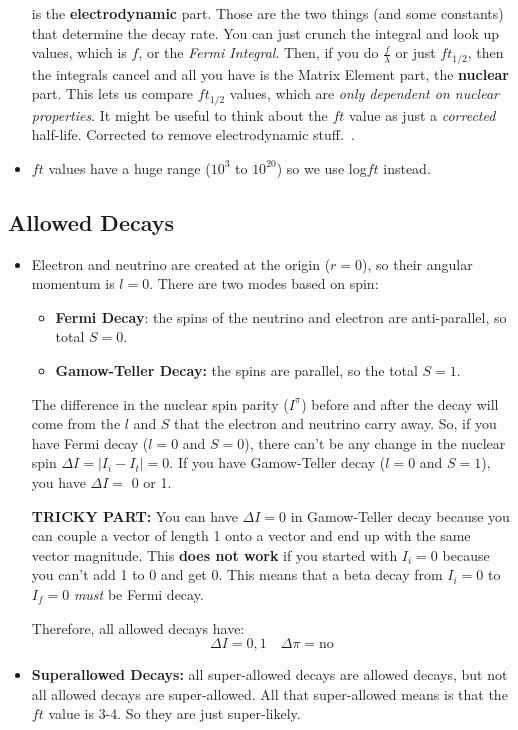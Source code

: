 \documentclass[letter]{article}
\begin{document}
\begin{itemize}
is the \textbf{electrodynamic} part. Those are the two things (and
some constants) that determine the decay rate. You can just crunch the
integral and look up values, which is $f$, or the \textit{Fermi
  Integral}. Then, if you do $\frac{f}{\lambda}$ or just $ft_{1/2}$,
then the integrals cancel and all you have is the Matrix Element part,
the \textbf{nuclear} part. This lets us compare $ft_{1/2}$ values,
which are \textit{only dependent on nuclear
  properties}. It might be useful to think about the $ft$ value as just a
\textit{corrected} half-life. Corrected to remove electrodynamic stuff.~\cite[pp. 282-283, Lecs. 19-21]{krane,lecture}.
\item $ft$ values have a huge range ($10^3$ to $10^{20}$) so we use
  log$ft$ instead.
\end{itemize}
\subsection{Allowed Decays}

\begin{itemize}
\item Electron and neutrino are created at the origin ($r=0$), so
  their angular momentum is $l=0$. There are two modes based on spin:
  \begin{itemize}
  \item \textbf{Fermi Decay}: the spins of the neutrino and electron
    are anti-parallel, so total $S=0$.
  \item \textbf{Gamow-Teller Decay:} the spins are parallel, so the
    total $S=1$.
  \end{itemize}
The difference in the nuclear spin parity ($I^\pi$) before and after
the decay will come from the
$l$ and $S$ that the electron and neutrino carry away. So, if you have
Fermi decay ($l=0$ and $S=0$), there can't be any change in the
nuclear spin $\Delta{}I = |I_i-I_t|=0$. If you have Gamow-Teller decay
($l=0$ and $S=1$), you have $\Delta{}I =$ 0 or 1. 
\begin{framed}
  \textbf{TRICKY PART:} You can have $\Delta{}I = 0$ in Gamow-Teller decay because you can
  couple a vector of length 1 onto a vector and end up with the same
  vector magnitude. This \textbf{does not work} if you started with
  $I_i=0$ because you can't add 1 to 0 and get 0. This means that a
  beta decay from $I_i=0$ to $I_f=0$ \textit{must} be Fermi decay.
\end{framed}
Therefore, all allowed decays have:
\begin{equation*}
  \Delta{}I = 0,1 \quad \Delta{}\pi = \text{no}
\end{equation*}
\cite[pp. 289, Lec. 19-21]{krane,lecture}
\item \textbf{Superallowed Decays:} all super-allowed decays are
  allowed decays, but not all allowed decays are super-allowed. All
  that super-allowed means is that the $ft$ value is 3-4. So they are
  just super-likely.
\end{itemize}
\end{document}
